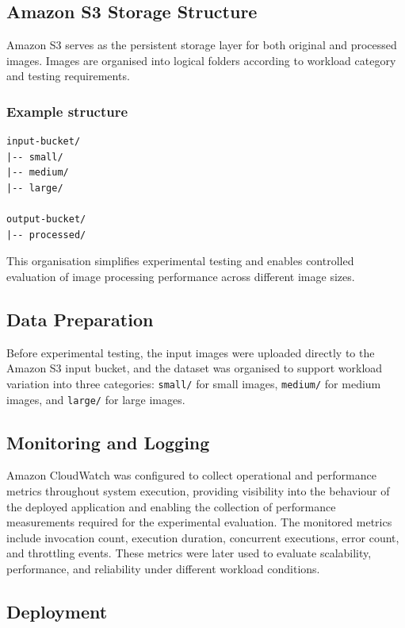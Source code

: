 \documentclass[11pt,a4paper,twocolumn]{article}
\begin{document}
\subsection{Amazon S3 Storage Structure}

Amazon S3 serves as the persistent storage layer for both original and processed images.
Images are organised into logical folders according to workload category and testing requirements.
    
\subsubsection*{Example structure}

\begin{verbatim}
input-bucket/
|-- small/
|-- medium/
|-- large/

output-bucket/
|-- processed/
\end{verbatim}

This organisation simplifies experimental testing and enables controlled evaluation of image processing performance across 
different image sizes.

\subsection{Data Preparation}

Before experimental testing, the input images were uploaded directly to the Amazon S3 input bucket, and the dataset was organised to support workload variation into three categories: \texttt{small/} for small images, \texttt{medium/} for medium images, and \texttt{large/} for large images.


\subsection{Monitoring and Logging}

Amazon CloudWatch was configured to collect operational and performance metrics throughout system execution, providing visibility into the behaviour of the deployed application and enabling the collection of performance measurements required for the experimental evaluation. The monitored metrics include invocation count, execution duration, concurrent executions, error count, and throttling events.
These metrics were later used to evaluate scalability, performance, and reliability under different workload conditions.


\subsection{Deployment}
\end{document}
